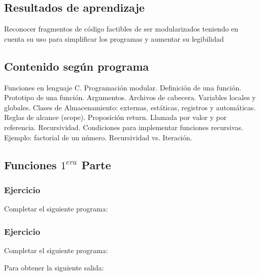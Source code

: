 \subsection*{Resultados de aprendizaje}
Reconocer fragmentos de código factibles de ser modularizados teniendo en cuenta su uso para simplificar los programas y aumentar su legibilidad

\subsection*{Contenido según programa}
Funciones en lenguaje C.  Programación modular.  Definición de una función.  Prototipo de una función.  Argumentos. Archivos de cabecera. Variables locales y globales. Clases de Almacenamiento: externas, estáticas, registros y automáticas. Reglas de alcance (scope).  Proposición return. Llamada por valor y por referencia.  Recursividad. Condiciones para implementar funciones recursivas. Ejemplo: factorial de un número.  Recursividad vs. Iteración.

\setcounter{subsection}{6}
\subsection*{Funciones $1^{era}$ Parte}

\subsubsection{Ejercicio}
Completar el siguiente programa:

\lstset{inputencoding=utf8/latin1}

{\small
  \lstset{inputencoding=utf8/latin1}
  
}

\subsubsection{Ejercicio}
Completar el siguiente programa:
\lstset{inputencoding=utf8/latin1}

Para obtener la siguiente salida:
{\small
  \lstset{inputencoding=utf8/latin1}
  
}

